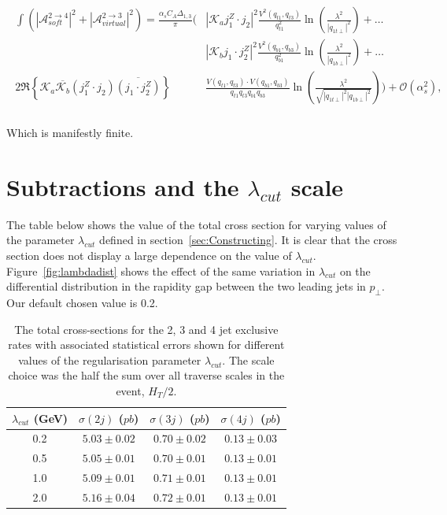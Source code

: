 		\begin{align}
		\begin{split}
			\int\left(|\mathcal{A}^{2\rightarrow4}_{soft}|^2 + |\mathcal{A}^{2\rightarrow3}_{virtual}|^2\right) =
			\frac{\alpha_sC_A\Delta_{1,3}}{\pi}\Bigg(&|\mathcal{K}_aj_1^Z\cdot j_2|^2 \frac{V^2(q_{t1},
			q_{t3})}{q_{t1}^2}\ln\left(\frac{\lambda^2}{|q_{1t\perp}|^2}\right)+\ldots \\
			& |\mathcal{K}_bj_1\cdot j_2^Z|^2 \frac{V^2(q_{b1}, q_{b3})}{q_{b1}^2}\ln
			\left(\frac{\lambda^2}{|q_{1b\perp}|^2}\right)+\ldots \\
			2\Re\left\{\mathcal{K}_a\overline{\mathcal{K}_b}  (j_1^Z\cdot j_2)\overline{(j_1\cdot j_2^Z)}\right\}
			&\frac{V(q_{t1}, q_{t3})\cdot V(q_{b1}, q_{b3})}{q_{t1}q_{t3}q_{b1}q_{b3}}\ln
			\left(\frac{\lambda^2}{\sqrt{|q_{1t\perp}|^2|q_{1b\perp}|^2}}\right)\Bigg) + \mathcal{O}(\alpha_s^2),\\
		\end{split}
		\end{align}

		Which is manifestly finite.

	\section{Subtractions and the $\lambda_{cut}$ scale}
		\label{sec:indep-lambd}

		The table below shows the value of the total cross section for varying values of
		the parameter $\lambda_{cut}$ defined in section~\eqref{sec:Constructing}.  It is
		clear that the cross section does not display a large dependence on the value of $\lambda_{cut}$.
		Figure~\eqref{fig:lambdadist} shows the effect of the same variation in $\lambda_{cut}$ on the
		differential distribution in the rapidity gap between the two leading jets in $p_\perp$.
		Our default chosen value is 0.2.

		\begin{table}[htp!]
		\begin{center}
			\begin{tabular}{| c | c | c | c |}
			\hline
			$\lambda_{cut}$ (GeV) & $\sigma(2j)$ ($pb$) & $\sigma(3j)$ ($pb$) & $\sigma(4j)$ ($pb$) \\ \hline
			0.2 & $5.03 \pm 0.02$ & $0.70 \pm 0.02$ & $0.13 \pm 0.03$ \\
			0.5 & $5.05 \pm 0.01$ & $0.70 \pm 0.01$ & $0.13 \pm 0.01$ \\
			1.0 & $5.09 \pm 0.01$ & $0.71 \pm 0.01$ & $0.13 \pm 0.01$ \\
			2.0 & $5.16 \pm 0.04$ & $0.72 \pm 0.01$ & $0.13 \pm 0.01$ \\ \hline
			\end{tabular}
			\caption{The total cross-sections for the 2, 3 and 4 jet exclusive rates with associated
			         statistical errors shown for different values of the regularisation parameter $\lambda_{cut}$.
			         The scale choice was the half the sum over all traverse scales in the event, $H_T/2$.}
		\end{center}
		\end{table}


